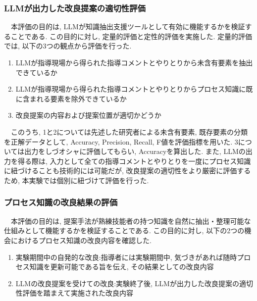 \subsubsection{LLMが出力した改良提案の適切性評価}
　本評価の目的は, LLMが知識抽出支援ツールとして有効に機能するかを検証することである. この目的に対し, 定量的評価と定性的評価を実施した. 定量的評価では, 以下の3つの観点から評価を行った.\\
\begin{enumerate}
\item LLMが指導現場から得られた指導コメントとやりとりから未含有要素を抽出できているか
\item LLMが指導現場から得られた指導コメントとやりとりからプロセス知識に既に含まれる要素を除外できているか
\item 改良提案の内容および提案位置が適切かどうか
\end{enumerate}
　このうち, 1と2については先述した研究者による未含有要素, 既存要素の分類を正解データとして, Accuracy, Precision, Recall, F値を評価指標を用いた. 3については出力をしづオシャに評価してもらい, Accuracyを算出した.
また, LLMの出力を得る際は, 入力として全ての指導コメントとやりとりを一度にプロセス知識に紐づけることも技術的には可能だが, 改良提案の適切性をより厳密に評価するため, 本実験では個別に紐づけて評価を行った. \\

\subsubsection{プロセス知識の改良結果の評価}
　本評価の目的は, 提案手法が熟練技能者の持つ知識を自然に抽出・整理可能な仕組みとして機能するかを検証することである. この目的に対し, 以下の2つの機会におけるプロセス知識の改良内容を確認した.\\
\begin{enumerate}
\item 実験期間中の自発的な改良:指導者には実験期間中, 気づきがあれば随時プロセス知識を更新可能である旨を伝え, その結果としての改良内容
\item LLMの改良提案を受けての改良:実験終了後, LLMが出力した改良提案の適切性評価を踏まえて実施された改良内容
\end{enumerate}

